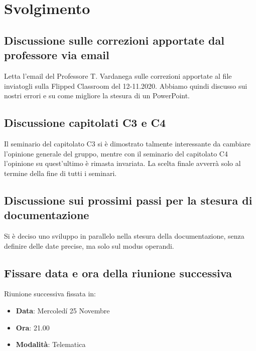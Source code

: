 \documentclass[]{article}
\begin{document}
\newpage

\section{Svolgimento}
\subsection{Discussione sulle correzioni apportate dal professore via email}
Letta l'email del Professore T. Vardanega sulle correzioni apportate al file inviatogli sulla Flipped Classroom del 12-11.2020.
Abbiamo quindi discusso sui nostri errori e su come migliore la stesura di un PowerPoint.\\

\subsection{Discussione capitolati C3 e C4}
Il seminario del capitolato C3 si è dimostrato talmente interessante da cambiare l'opinione generale del gruppo, mentre con il seminario del capitolato C4 l'opinione su quest'ultimo è rimasta invariata. La scelta finale avverrà solo al termine della fine di tutti i seminari.\\

\subsection{Discussione sui prossimi passi per la stesura di documentazione}
Si è deciso uno sviluppo in parallelo nella stesura della documentazione, senza definire delle date precise, ma solo sul modus operandi.

\subsection{Fissare data e ora della riunione successiva}
Riunione successiva fissata in:
\begin{itemize}
	\item \textbf{Data}: Mercoledí 25 Novembre
	\item \textbf{Ora}: 21.00
	\item \textbf{Modalità}: Telematica
\end{itemize}


	
\end{document}
